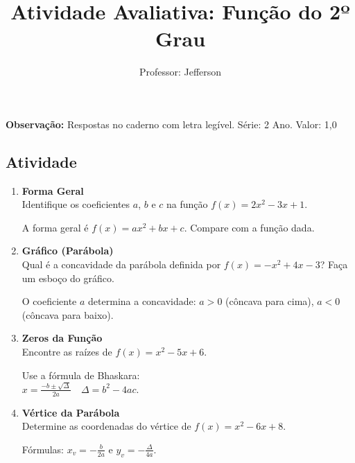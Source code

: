 \documentclass[11pt]{article}
\title{\textcolor{titleblue}{Atividade Avaliativa: Função do 2º Grau}}
\author{Professor: Jefferson}
\date{}
\begin{document}
\maketitle
\vspace{-1cm}

\begin{center}
    \large{\textbf{Observação:} Respostas no caderno com letra legível. \quad Série: 2 Ano. Valor: 1,0 }
\end{center}

\begin{multicols}{2}

\section*{Atividade}
\begin{enumerate}

\item \textbf{Forma Geral}\\
Identifique os coeficientes $a$, $b$ e $c$ na função $f(x) = 2x^2 - 3x + 1$.
\begin{tcolorbox}[colback=explanationbg,colframe=titleblue,title=Dica:]
A forma geral é $f(x) = ax^2 + bx + c$. Compare com a função dada.
\end{tcolorbox}

\item \textbf{Gráfico (Parábola)}\\
Qual é a concavidade da parábola definida por $f(x) = -x^2 + 4x - 3$? Faça um esboço do gráfico.
\begin{tcolorbox}[colback=explanationbg,colframe=titleblue,title=Dica:]
O coeficiente $a$ determina a concavidade: $a > 0$ (côncava para cima), $a < 0$ (côncava para baixo). 
\end{tcolorbox}

\item \textbf{Zeros da Função}\\
Encontre as raízes de $f(x) = x^2 - 5x + 6$.
\begin{tcolorbox}[colback=explanationbg,colframe=titleblue,title=Dica:]
Use a fórmula de Bhaskara: \\ $x = \frac{-b \pm \sqrt{\Delta}}{2a} \quad \Delta = b^2 - 4ac$.
\end{tcolorbox}

\item \textbf{Vértice da Parábola}\\
Determine as coordenadas do vértice de $f(x) = x^2 - 6x + 8$.
\begin{tcolorbox}[colback=explanationbg,colframe=titleblue,title=Dica:]
    Fórmulas: $x_v = -\frac{b}{2a}$ e $y_v = - \frac{\Delta}{4a}$.
\end{tcolorbox}


\end{enumerate}
\end{multicols}
\end{document}
